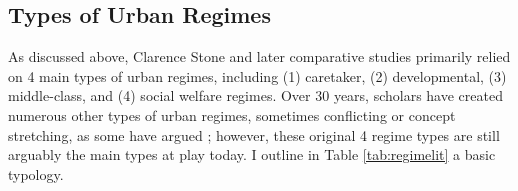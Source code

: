 \documentclass[preprint, 3p,
authoryear]{elsarticle} %
\begin{document}
\hypertarget{types-of-urban-regimes}{%
\subsection{Types of Urban Regimes}\label{types-of-urban-regimes}}

As discussed above, Clarence Stone \citeyearpar{stone_1993} and later
comparative studies \citep{kilburn_2004, de_socio_2007} primarily relied
on 4 main types of urban regimes, including (1) caretaker, (2)
developmental, (3) middle-class, and (4) social welfare regimes. Over 30
years, scholars have created numerous other types of urban regimes,
sometimes conflicting or concept stretching, as some have argued
\citep{mossberger_and_stoker_2001}; however, these original 4 regime
types are still arguably the main types at play today. I outline in
Table \ref{tab:regimelit} a basic typology.
\end{document}
